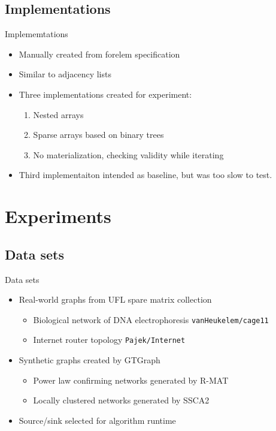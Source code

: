 \documentclass{beamer}
\begin{document}
\subsection{Implementations}

\begin{frame}{Implememtations}
	\begin{itemize}
		\item Manually created from forelem specification
		\item Similar to adjacency lists
		\item Three implementations created for experiment:
			\begin{enumerate}
				\item Nested arrays
				\item Sparse arrays based on binary trees
				\item No materialization, checking validity while iterating
			\end{enumerate}\pause

		\item Third implementaiton intended as baseline, but was too slow to test.
	\end{itemize}
\end{frame}

\section{Experiments}

\subsection{Data sets}

\begin{frame}{Data sets}
	\begin{itemize}
		\item Real-world graphs from UFL spare matrix collection
			\begin{itemize}
				\item Biological network of DNA electrophoresis \texttt{vanHeukelem/cage11}
				\item Internet router topology \texttt{Pajek/Internet}
			\end{itemize}

		\item Synthetic graphs created by GTGraph
			\begin{itemize}
				\item Power law confirming networks generated by R-MAT
				\item Locally clustered networks generated by SSCA2
			\end{itemize}

		\item Source/sink selected for algorithm runtime
	\end{itemize}
\end{frame}
\end{document}
